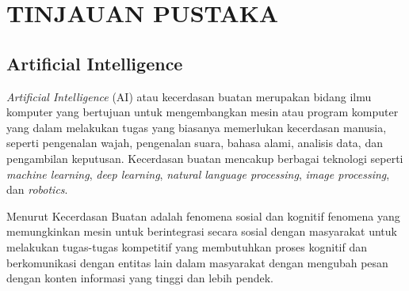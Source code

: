 \chapter{TINJAUAN PUSTAKA}

\section{Artificial Intelligence}
\textit{Artificial Intelligence} (AI) atau kecerdasan buatan merupakan bidang ilmu komputer yang bertujuan untuk mengembangkan mesin atau program komputer yang dalam melakukan tugas yang biasanya memerlukan kecerdasan manusia, seperti pengenalan wajah, pengenalan suara, bahasa alami, analisis data, dan pengambilan keputusan. Kecerdasan buatan mencakup berbagai teknologi seperti \textit{machine learning}, \textit{deep learning}, \textit{natural language processing}, \textit{image processing}, dan \textit{robotics}.

Menurut \cite{abbas2021} Kecerdasan Buatan adalah fenomena sosial dan kognitif fenomena yang memungkinkan mesin untuk berintegrasi secara sosial dengan masyarakat untuk melakukan tugas-tugas kompetitif yang membutuhkan proses kognitif dan berkomunikasi dengan entitas lain dalam masyarakat dengan mengubah pesan dengan konten informasi yang tinggi dan lebih pendek.
